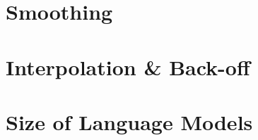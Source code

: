 \documentclass{beamer}
\begin{document}




\section{Smoothing}



\section{Interpolation \& Back-off}




\section{Size of Language Models}



























\end{document}
